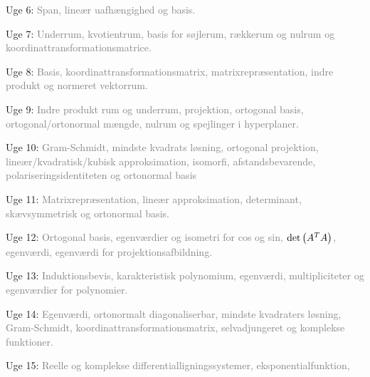 \documentclass[a4paper,oneside,article]{memoir}
\begin{document}
Uge 6: \textcolor{gray}{ Span, lineær uafhængighed og basis. }

Uge 7: \textcolor{gray}{ Underrum, kvotientrum, basis for søjlerum, rækkerum og nulrum og koordinattransformationsmatrice. }

Uge 8: \textcolor{gray}{ Basis, koordinattransformationsmatrix, matrixrepræsentation, indre produkt og normeret vektorrum.}

Uge 9: \textcolor{gray}{ Indre produkt rum og underrum, projektion, ortogonal basis, ortogonal/ortonormal mængde, nulrum og spejlinger i hyperplaner. }

Uge 10: \textcolor{gray}{ Gram-Schmidt, mindste kvadrats løsning, ortogonal projektion, lineær/kvadratisk/kubisk approksimation, isomorfi, afstandsbevarende, polariseringsidentiteten og ortonormal basis}

Uge 11: \textcolor{gray}{Matrixrepræsentation, lineær approksimation, determinant, skævsymmetrisk og ortonormal basis.}

Uge 12: \textcolor{gray}{Ortogonal basis, egenværdier og isometri for cos og sin, $\text{det}\br{A^TA}$, egenværdi, egenværdi for projektionsafbildning.}

Uge 13: \textcolor{gray}{Induktionsbevis, karakteristisk polynomium, egenværdi, multipliciteter og egenværdier for polynomier.}

Uge 14: \textcolor{gray}{Egenværdi, ortonormalt diagonaliserbar, mindste kvadraters løsning, Gram-Schmidt, koordinattransformationsmatrix, selvadjungeret og komplekse funktioner.}

Uge 15: \textcolor{gray}{Reelle og komplekse differentialligningssystemer, eksponentialfunktion, }





\end{document}
